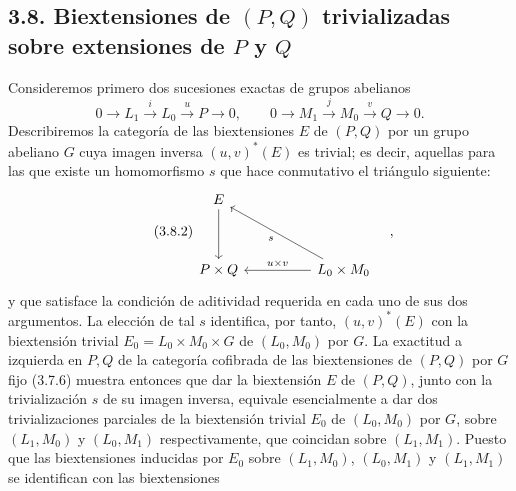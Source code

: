 
\subsection*{3.8. Biextensiones de $(P,Q)$ trivializadas sobre
extensiones de $P$ y $Q$}

Consideremos primero dos sucesiones exactas de grupos abelianos
\begin{equation}\tag{3.8.1}
 0\longrightarrow L_1\xrightarrow{\ i\ }L_0\xrightarrow{\ u\ }P
 \longrightarrow0,\qquad
 0\longrightarrow M_1\xrightarrow{\ j\ }M_0\xrightarrow{\ v\ }Q
 \longrightarrow0.
\end{equation}
Describiremos la categoría de las biextensiones $E$ de $(P,Q)$ por un
grupo abeliano $G$ cuya imagen inversa $(u,v)^*(E)$ es trivial; es
decir, aquellas para las que existe un homomorfismo $s$ que hace
conmutativo el triángulo siguiente:
\begin{equation}\tag{3.8.2}
\begin{tikzcd}[column sep=huge,row sep=huge]
 E\arrow[d]\sisi{\arrow[dr,dash,"s"]}{}&\\
 P\times Q&L_0\times M_0\arrow[l,"u\times v"']%
 \sisi{}{\arrow[ul,"s"]}
\end{tikzcd}\quad ,
\end{equation}
y que satisface la condición de aditividad requerida en cada uno de
sus dos argumentos. La elección de tal $s$ identifica, por tanto,
$(u,v)^*(E)$ con la biextensión trivial
$E_0=L_0\times M_0\times G$ de $(L_0,M_0)$ por $G$. La exactitud a
izquierda en $P,Q$ de la categoría cofibrada de las biextensiones de
$(P,Q)$ por $G$ fijo (3.7.6) muestra entonces que dar la biextensión
$E$ de $(P,Q)$, junto con la trivialización $s$ de su imagen inversa,
equivale esencialmente a dar dos trivializaciones parciales de la
biextensión trivial $E_0$ de $(L_0,M_0)$ por $G$, sobre $(L_1,M_0)$ y
$(L_0,M_1)$ respectivamente, que coincidan sobre $(L_1,M_1)$. Puesto
que las biextensiones inducidas por $E_0$ sobre $(L_1,M_0)$,
$(L_0,M_1)$ y $(L_1,M_1)$ se identifican con las biextensiones
